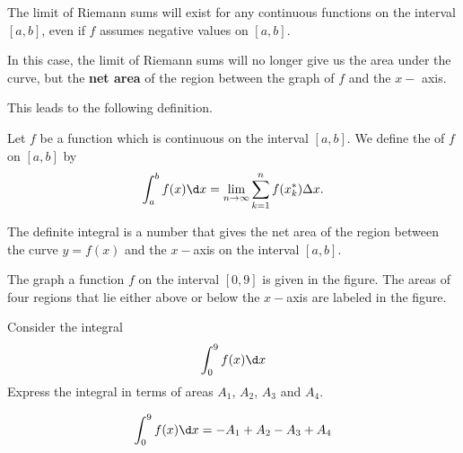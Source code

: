 \documentclass{ximera}
\begin{document}
The limit of Riemann sums will exist for any continuous functions on the interval $[a,b]$, even if $f$ assumes negative values on $[a,b]$.

In this case, the limit of Riemann sums will no longer give us the area under the curve, but the  \textbf{net area} of the region between the graph of $f$ and the $x-$ axis.

This leads to the following definition.
\begin{definition}
Let $f$ be a function which is continuous on the interval $[a,b]$. We define the  of $f$ on $[a,b]$ by
\[
\int_a^b f(x) \d x=\lim_{n\to\infty}\sum_{k=1}^n f(x_k^*)\Delta x.
\]
\end{definition}
The definite integral is a number that gives the net area of the region between the curve $y=f(x)$ and the $x-$axis on the interval $[a,b]$.  
 
\begin{example} The graph a function $f$ on the interval $[0,9]$ is given in the figure. The areas of  four regions that lie either above or below the $x-$axis are labeled in the figure.

 \begin{image}
\end{image}
Consider the integral
\[
\int_0^9 f(x) \d x
\]
Express the integral in terms of areas $A_1$, $A_2$, $A_3$ and $A_4$.
\begin{explanation}
\begin{align*}
    \int_0^9 f(x) \d x&= -A_1+A_2-A_3+A_4\\
\end{align*}

\end{explanation}
\end{example}
\end{document}
